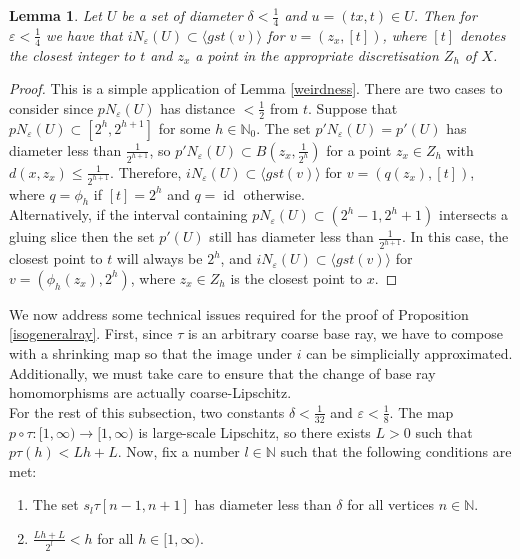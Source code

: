 \documentclass[a4paper,11pt]{article}
\theoremstyle{definition}
\theoremstyle{plain}
\newtheorem{lemma}[definition]{Lemma}
\theoremstyle{remark}
\DeclareMathOperator{\id}{id}
\begin{document}
{\begin{lemma} \label{shiftweirdness} Let $U$ be a set of diameter $\delta<\frac{1}{4}$ and $u = (tx,t)\in U$. Then for $\varepsilon<\frac{1}{4}$ we have that $iN_{\varepsilon}(U)\subset \langle gst(v)\rangle$ for $v = (z_{x},[t])$, where $[t]$ denotes the closest integer to $t$ and $z_{x}$ a point in the appropriate discretisation $Z_{h}$ of $X$. 
\end{lemma}

\begin{proof} This is a simple application of Lemma \ref{weirdness}. There are two cases to consider since $pN_{\varepsilon}(U)$ has distance $<\frac{1}{2}$ from $t$. Suppose that $pN_{\varepsilon}(U)\subset [2^h,2^{h+1}]$ for some $h\in \mathbb{N}_{0}$. The set $p'N_{\varepsilon}(U)=p'(U)$ has diameter less than $\frac{1}{2^{h+1}}$, so $p'N_{\varepsilon}(U) \subset B(z_{x},\frac{1}{2^h})$ for a point $z_{x}\in Z_{h}$ with $d(x,z_{x})\leq\frac{1}{2^{h+1}}$. Therefore, $iN_{\varepsilon}(U)\subset \langle gst(v)\rangle$ for $v = (q(z_{x}),[t])$, where $q=\phi_{h}$ if $[t]=2^h$ and $q=\id$ otherwise. \\

Alternatively, if the interval containing $pN_{\varepsilon}(U)\subset (2^{h}-1,2^{h}+1)$ intersects a gluing slice then the set $p'(U)$ still has diameter less than $\frac{1}{2^{h+1}}$. In this case, the closest point to $t$ will always be $2^h$, and $iN_{\varepsilon}(U)\subset \langle gst(v)\rangle$ for $v = (\phi_{h}(z_{x}),2^h)$, where $z_{x}\in Z_{h}$ is the closest point to $x$. 
\end{proof}

We now address some technical issues required for the proof of Proposition \ref{isogeneralray}. First, since $\tau$ is an arbitrary coarse base ray, we have to compose with a shrinking map so that the image under $i$ can be simplicially approximated. Additionally, we must take care to ensure that the change of base ray homomorphisms are actually coarse-Lipschitz. \\

For the rest of this subsection, two constants $\delta<\frac{1}{32}$ and $\varepsilon<\frac{1}{8}$. The map $p\circ \tau: [1,\infty)\rightarrow [1,\infty)$ is large-scale Lipschitz, so there exists $L>0$ such that $p\tau(h)< Lh+L$. Now, fix a number $l\in \mathbb{N}$ such that the following conditions are met:

\begin{enumerate}
\item The set $s_{l}\tau [n-1,n+1]$ has diameter less than $\delta$ for all vertices $n\in \mathbb{N}$.  
\item $\frac{Lh+L}{2^l}< h$ for all $h\in [1,\infty)$. 
\end{enumerate}

}
\end{document}
